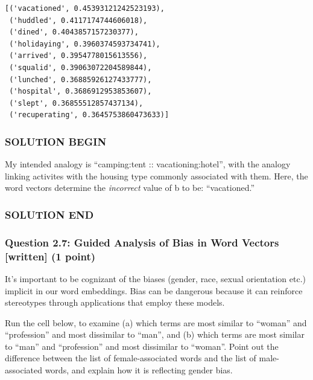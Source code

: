 \documentclass[11pt]{article}
\begin{document}
    \begin{Verbatim}[commandchars=\\\{\}]
[('vacationed', 0.45393121242523193),
 ('huddled', 0.4117174744606018),
 ('dined', 0.4043857157230377),
 ('holidaying', 0.3960374593734741),
 ('arrived', 0.3954778015613556),
 ('squalid', 0.39063072204589844),
 ('lunched', 0.36885926127433777),
 ('hospital', 0.3686912953853607),
 ('slept', 0.36855512857437134),
 ('recuperating', 0.3645753860473633)]
    \end{Verbatim}

    \hypertarget{solution-begin}{%
\subsubsection{SOLUTION BEGIN}\label{solution-begin}}

My intended analogy is ``camping:tent :: vacationing:hotel'', with the
analogy linking activites with the housing type commonly associated with
them. Here, the word vectors determine the \emph{incorrect} value of b
to be: ``vacationed.''

\hypertarget{solution-end}{%
\subsubsection{SOLUTION END}\label{solution-end}}

    \hypertarget{question-2.7-guided-analysis-of-bias-in-word-vectors-written-1-point}{%
\subsubsection{Question 2.7: Guided Analysis of Bias in Word Vectors
{[}written{]} (1
point)}\label{question-2.7-guided-analysis-of-bias-in-word-vectors-written-1-point}}

It's important to be cognizant of the biases (gender, race, sexual
orientation etc.) implicit in our word embeddings. Bias can be dangerous
because it can reinforce stereotypes through applications that employ
these models.

Run the cell below, to examine (a) which terms are most similar to
``woman'' and ``profession'' and most dissimilar to ``man'', and (b)
which terms are most similar to ``man'' and ``profession'' and most
dissimilar to ``woman''. Point out the difference between the list of
female-associated words and the list of male-associated words, and
explain how it is reflecting gender bias.
\end{document}
